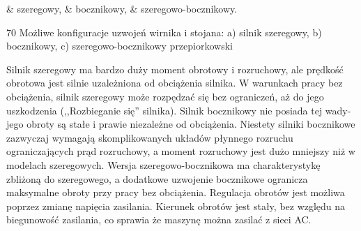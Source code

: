 \begin{easylist}
	& szeregowy,
	& bocznikowy,
	& szeregowo-bocznikowy.
\end{easylist}

		{70}
		{Możliwe konfiguracje uzwojeń wirnika i stojana: a) silnik szeregowy, b) bocznikowy, c) szeregowo-bocznikowy}
		{przepiorkowski}

Silnik szeregowy ma bardzo duży moment obrotowy i rozruchowy, ale prędkość obrotowa jest silnie uzależniona od obciążenia silnika. W warunkach pracy bez obciążenia, silnik szeregowy może rozpędzać się bez ograniczeń, aż do jego uszkodzenia (,,Rozbieganie się'' silnika). Silnik bocznikowy nie posiada tej wady- jego obroty są stałe i prawie niezależne od obciążenia. Niestety silniki bocznikowe zazwyczaj wymagają skomplikowanych układów płynnego rozruchu ograniczających prąd rozruchowy, a moment rozruchowy jest dużo mniejszy niż w modelach szeregowych. Wersja szeregowo-bocznikowa ma charakterystykę zbliżoną do szeregowego, a dodatkowe uzwojenie bocznikowe ogranicza maksymalne obroty przy pracy bez obciążenia. Regulacja obrotów jest możliwa poprzez zmianę napięcia zasilania. Kierunek obrotów jest stały, bez względu na biegunowość zasilania, co sprawia że maszynę można zasilać z sieci AC.


